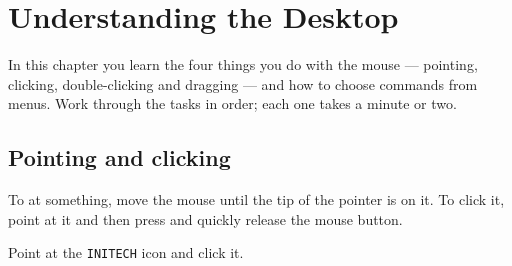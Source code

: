 \chapter{Understanding the Desktop}
\label{ch:desktop}

In this chapter you learn the four things you do with the mouse ---
pointing, clicking, double-clicking and dragging --- and how to choose
commands from menus.  Work through the tasks in order; each one takes a
minute or two.

\section{Pointing and clicking}
To  at something, move the mouse until the tip of the pointer
is on it.  To click it, point at it and then press and quickly release the
mouse button.
\begin{TaskSteps}
\Step Point at the \texttt{INITECH} icon and click it.
\end{TaskSteps}

